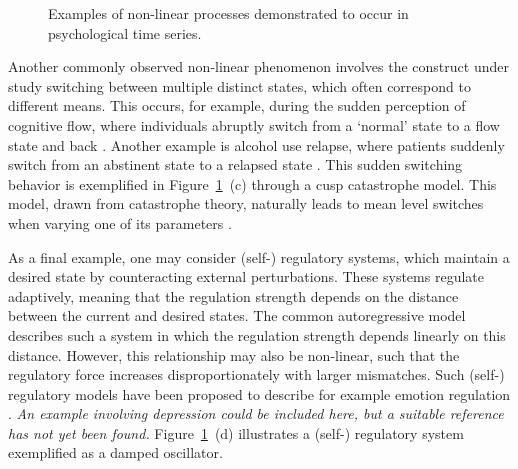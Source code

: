 \documentclass[man, floatsintext]{apa7}
\begin{document}
\begin{figure}[!ht]
  \caption{Examples of non-linear processes demonstrated to occur in
    psychological time series.}
  \label{fig:examplar_npn}
\end{figure}

Another commonly observed non-linear phenomenon involves the construct under
study switching between multiple distinct states, which often
correspond to different
means. This occurs, for example, during the sudden perception of cognitive
flow, where individuals abruptly switch from a `normal' state to a flow state
and back \parencite{ceja_suddenly_2012}. Another example is alcohol use
relapse, where patients suddenly switch from an abstinent state to a relapsed
state \parencite{witkiewitz_modeling_2007}. This sudden switching behavior is
exemplified in Figure~\ref{fig:examplar_npn}~(c)
through a cusp catastrophe model. This model, drawn from catastrophe
theory, naturally leads to mean level switches when varying one of its
parameters \parencite{van_der_maas_sudden_2003,chow_cusp_2015}.

As a final example, one may consider (self-) regulatory systems, which maintain
a desired state by counteracting external perturbations. These systems regulate
adaptively, meaning that the regulation strength depends on the distance
between the
current and desired states. The common autoregressive model describes such a
system in which the regulation strength depends linearly on this distance.
However, this relationship may also be non-linear, such that the
regulatory force increases disproportionately with larger mismatches. Such
(self-) regulatory models have been proposed to describe for example emotion
regulation
\parencite{chow_emotion_2005}. \textit{An example involving depression could be
  included here, but a suitable reference has not yet been found.}
Figure~\ref{fig:examplar_npn}~(d) illustrates a
(self-) regulatory system exemplified as a damped oscillator.
\end{document}
